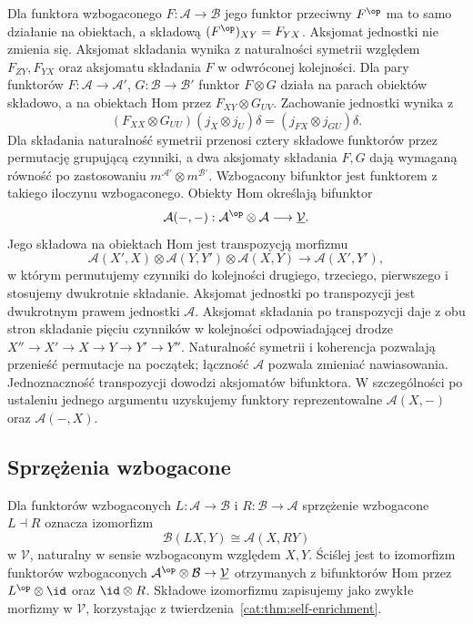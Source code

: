 Dla funktora wzbogaconego $F:\mathcal A\to\mathcal B$ jego funktor przeciwny $F^{\op}$ ma to samo działanie na obiektach, a składową $(F^{\op})_{XY}=F_{YX}$. Aksjomat jednostki nie zmienia się. Aksjomat składania wynika z naturalności symetrii względem $F_{ZY},F_{YX}$ oraz aksjomatu składania $F$ w odwróconej kolejności. Dla pary funktorów $F:\mathcal A\to\mathcal A'$, $G:\mathcal B\to\mathcal B'$ funktor $F\otimes G$ działa na parach obiektów składowo, a na obiektach Hom przez $F_{XY}\otimes G_{UV}$. Zachowanie jednostki wynika z
\[
 (F_{XX}\otimes G_{UU})(j_X\otimes j_U)\delta
 =(j_{FX}\otimes j_{GU})\delta.
\]
Dla składania naturalność symetrii przenosi cztery składowe funktorów przez permutację grupującą czynniki, a dwa aksjomaty składania $F,G$ dają wymaganą równość po zastosowaniu $m^{\mathcal A'}\otimes m^{\mathcal B'}$. Wzbogacony bifunktor jest funktorem z takiego iloczynu wzbogaconego. Obiekty Hom określają bifunktor
\[
 \mathcal A(-,-):\mathcal A^{\op}\otimes\mathcal A
 \longrightarrow\underline{\mathcal V}.
\]
Jego składowa na obiektach Hom jest transpozycją morfizmu
\[
 \mathcal A(X',X)\otimes\mathcal A(Y,Y')\otimes\mathcal A(X,Y)
 \longrightarrow\mathcal A(X',Y'),
\]
w którym permutujemy czynniki do kolejności drugiego, trzeciego, pierwszego i stosujemy dwukrotnie składanie. Aksjomat jednostki po transpozycji jest dwukrotnym prawem jednostki $\mathcal A$. Aksjomat składania po transpozycji daje z obu stron składanie pięciu czynników w kolejności odpowiadającej drodze $X''\to X'\to X\to Y\to Y'\to Y''$. Naturalność symetrii i koherencja pozwalają przenieść permutacje na początek; łączność $\mathcal A$ pozwala zmieniać nawiasowania. Jednoznaczność transpozycji dowodzi aksjomatów bifunktora. W szczególności po ustaleniu jednego argumentu uzyskujemy funktory reprezentowalne $\mathcal A(X,-)$ oraz $\mathcal A(-,X)$.

\subsection{Sprzężenia wzbogacone}

\begin{definicja}\label{cat:def:enriched-adjunction}
Dla funktorów wzbogaconych $L:\mathcal A\to\mathcal B$ i $R:\mathcal B\to\mathcal A$ sprzężenie wzbogacone $L\dashv R$ oznacza izomorfizm
\[
 \mathcal B(LX,Y)\cong\mathcal A(X,RY)
\]
w $\mathcal V$, naturalny w sensie wzbogaconym względem $X,Y$. Ściślej jest to izomorfizm funktorów wzbogaconych $\mathcal A^{\op}\otimes\mathcal B\to\underline{\mathcal V}$ otrzymanych z bifunktorów Hom przez $L^{\op}\otimes\id$ oraz $\id\otimes R$. Składowe izomorfizmu zapisujemy jako zwykłe morfizmy w $\mathcal V$, korzystając z twierdzenia~\ref{cat:thm:self-enrichment}.
\end{definicja}

